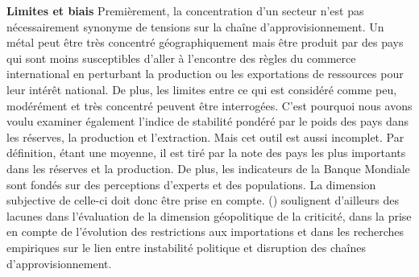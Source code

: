 \smallbreak
\smallbreak
\textbf{Limites et biais}
\smallbreak
Premièrement, la concentration d'un secteur n'est pas nécessairement synonyme de tensions sur la chaîne d'approvisionnement. Un métal peut être très concentré géographiquement mais être produit par des pays qui sont moins susceptibles d'aller à l'encontre des règles du commerce international en perturbant la production ou les exportations de ressources pour leur intérêt national. De plus, les limites entre ce qui est considéré comme peu, modérément et très concentré peuvent être interrogées.
\smallbreak
C'est pourquoi nous avons voulu examiner également l'indice de stabilité pondéré par le poids des pays dans les réserves, la production et l'extraction. Mais cet outil est aussi incomplet. Par définition, étant une moyenne, il est tiré par la note des pays les plus importants dans les réserves et la production. De plus, les indicateurs de la Banque Mondiale sont fondés sur des perceptions d'experts et des populations. La dimension subjective de celle-ci doit donc être prise en compte.
\smallbreak
(\cite{hache_vers_2019}) soulignent d'ailleurs des lacunes dans l'évaluation de la dimension géopolitique de la criticité, dans la prise en compte de l'évolution des restrictions aux importations et dans les recherches empiriques sur le lien entre instabilité politique et disruption des chaînes d'approvisionnement.

